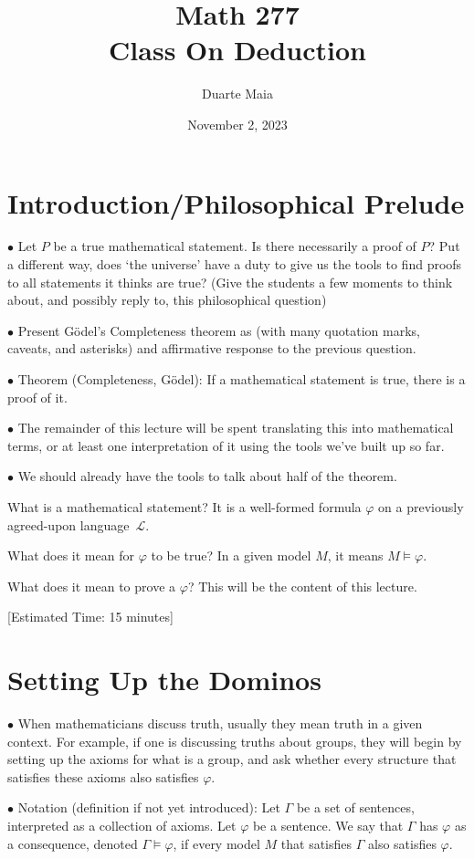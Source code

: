 \documentclass{article}
\title{Math 277\\Class On Deduction}
\author{Duarte Maia}
\date{November 2, 2023}
\newcommand{\Lang}{\mathcal{L}}
\newcommand\point[1]{\noindent \hspace{\labelsep} $\bullet$ #1 \smallskip}
\newcommand\timestamp[1]{\noindent \hspace{\labelsep} [Estimated Time: #1] \smallskip}
\begin{document}
\maketitle

\section{Introduction/Philosophical Prelude}

\point{Let $P$ be a true mathematical statement. Is there necessarily a proof of $P$? Put a different way, does `the universe' have a duty to give us the tools to find proofs to all statements it thinks are true? (Give the students a few moments to think about, and possibly reply to, this philosophical question)}

\point{Present Gödel's Completeness theorem as (with many quotation marks, caveats, and asterisks) and affirmative response to the previous question.}

\point{Theorem (Completeness, Gödel): If a mathematical statement is true, there is a proof of it.}

\point{The remainder of this lecture will be spent translating this into mathematical terms, or at least one interpretation of it using the tools we've built up so far.}

\point{We should already have the tools to talk about half of the theorem.

What is a mathematical statement? It is a well-formed formula $\varphi$ on a previously agreed-upon language~$\Lang$.

What does it mean for $\varphi$ to be true? In a given model $M$, it means $M \vDash \varphi$.

What does it mean to prove a $\varphi$? This will be the content of this lecture.}

\timestamp{15 minutes}

\section{Setting Up the Dominos}

\point{When mathematicians discuss truth, usually they mean truth in a given context. For example, if one is discussing truths about groups, they will begin by setting up the axioms for what is a group, and ask whether every structure that satisfies these axioms also satisfies $\varphi$.}

\point{Notation (definition if not yet introduced): Let $\Gamma$ be a set of sentences, interpreted as a collection of axioms. Let $\varphi$ be a sentence. We say that $\Gamma$ has $\varphi$ as a consequence, denoted $\Gamma \vDash \varphi$, if every model $M$ that satisfies $\Gamma$ also satisfies $\varphi$.}
\end{document}

